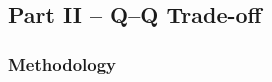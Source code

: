 \documentclass[subeqn]{article}
\begin{document}
\begin{spacing}{1.4}



\setcounter{section}{0}
\part*{Part II --  Q--Q Trade-off}
\section{Methodology}
\label{TWINscn:method}

\end{spacing}
\end{document}

